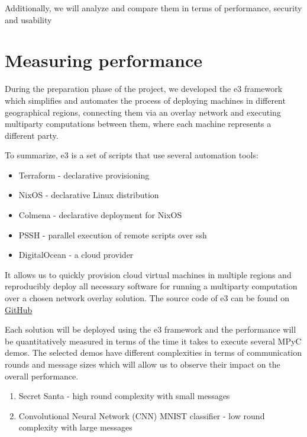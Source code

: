 Additionally, we will analyze and compare them in terms of performance,
security and usability

\hypertarget{measuring-performance}{%
\section{Measuring performance}\label{measuring-performance}}

During the preparation phase of the project, we developed the \gls{e3}
framework which simplifies and automates the process of deploying
machines in different geographical regions, connecting them via an
overlay network and executing multiparty computations between them,
where each machine represents a different party.

To summarize, \gls{e3} is a set of scripts that use several automation
tools:

\begin{itemize}
\tightlist
\item
  Terraform - declarative provisioning
\item
  NixOS - declarative Linux distribution
\item
  Colmena - declarative deployment for NixOS
\item
  PSSH - parallel execution of remote scripts over ssh
\item
  DigitalOcean - a cloud provider
\end{itemize}

It allows us to quickly provision cloud virtual machines in multiple
regions and reproducibly deploy all necessary software for running a
multiparty computation over a chosen network overlay solution. The
source code of \gls{e3} can be found on
\href{https://github.com/e-nikolov/mpyc}{GitHub}

Each solution will be deployed using the \gls{e3} framework and the
performance will be quantitatively measured in terms of the time it
takes to execute several MPyC demos. The selected demos have different
complexities in terms of communication rounds and message sizes which
will allow us to observe their impact on the overall performance.

\begin{enumerate}
\def\labelenumi{\arabic{enumi}.}
\tightlist
\item
  Secret Santa - high round complexity with small messages
\item
  Convolutional Neural Network (CNN) MNIST classifier - low round
  complexity with large messages
\end{enumerate}

